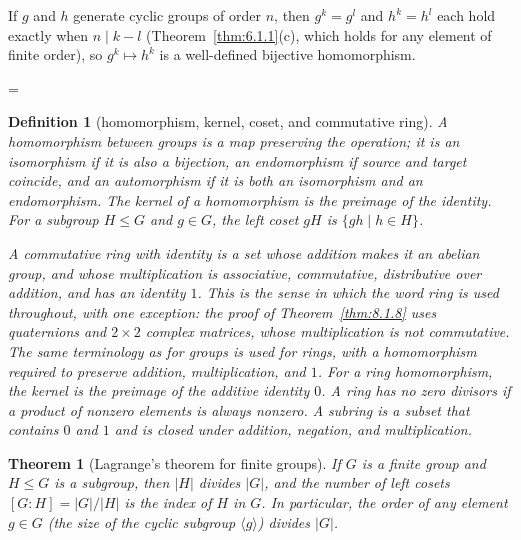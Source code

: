 \documentclass[11pt]{article}
\makeatletter
\theoremstyle{ntstyle}
\newtheorem{theorem}{Theorem}[subsection]
\newtheorem{definition}{Definition}[subsection]
\let\nt@closedisplay\]
\def\nt@guardedclose{\@ifnextchar\par{\nt@closeafterpar}{\@ifnextchar\end{\postdisplaypenalty\@M\nt@closedisplay}{\nt@closedisplay}}}
\def\nt@closeafterpar\par{\@ifnextchar\par{\nt@closeafterpar}{\@ifnextchar\end{\postdisplaypenalty\@M\nt@closedisplay\par}{\nt@closedisplay\par}}}
\renewenvironment{proof}[1][\proofname]{\par
  \pushQED{\qed}\normalfont\topsep\medskipamount\edef\nt@afterproof{\@endparpenalty=\the\@endparpenalty\relax}\@beginparpenalty\@M\@endparpenalty\@M\let\]\nt@guardedclose\trivlist\item[]\textit{#1\@addpunct{.}} \ignorespaces}{\ifvmode\addpenalty\@M\fi\popQED\nt@afterproof\endtrivlist\@endpefalse}
\makeatother
\begin{document}
\begin{proof} If $g$ and $h$ generate cyclic
	groups of order $n$, then $g^k=g^l$ and $h^k=h^l$ each hold exactly when
	$n\mid k-l$ (Theorem~\ref{thm:6.1.1}(c), which holds for any element of finite
	order), so $g^k\mapsto h^k$ is a well-defined bijective homomorphism.

\end{proof}
\begin{definition}[homomorphism, kernel, coset, and commutative ring]\label{def:6.6.4}
	A homomorphism between groups is a map preserving the operation; it is
	an isomorphism if it is also a bijection, an endomorphism if source and
	target coincide, and an automorphism if it is both an isomorphism and an endomorphism. The kernel of a
	homomorphism is the preimage of the identity. For a subgroup $H\le G$
	and $g\in G$, the left coset $gH$ is $\{gh\mid h\in H\}$.

	A commutative ring with identity is a set whose addition makes it an
	abelian group, and whose multiplication is associative, commutative,
	distributive over addition, and has an identity $1$.
	This is the sense in which the word ring is used throughout, with
	one exception: the proof of Theorem~\ref{thm:8.1.8} uses quaternions
	and $2 \times 2$ complex matrices, whose multiplication is not
	commutative.
	The same terminology as for groups is used for rings, with a
	homomorphism required
	to preserve addition, multiplication, and $1$. For a ring homomorphism, the kernel is the preimage
	of the additive identity $0$. A ring has no zero divisors if a product
	of nonzero elements is always nonzero. A subring is a subset that
	contains $0$ and $1$ and is closed under addition, negation, and
	multiplication.

\end{definition}


\begin{theorem}[Lagrange's theorem for finite groups]\label{thm:6.6.2} If $G$ is a
	finite group and $H \le G$ is a subgroup, then $|H|$ divides $|G|$, and
	the number of left cosets $[G:H] = |G|/|H|$ is the index of $H$ in
	$G$. In particular, the order of any element $g \in G$ (the size of
	the cyclic subgroup $\langle g\rangle$) divides $|G|$.

\end{theorem}
\end{document}
